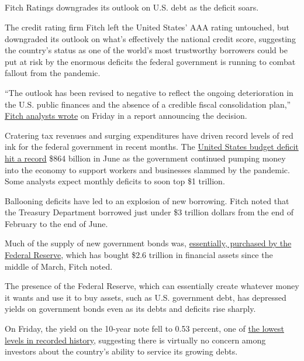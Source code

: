 \hypertarget{-7}{%
\subsection{}\label{-7}}

Fitch Ratings downgrades its outlook on U.S. debt as the deficit soars.

The credit rating firm Fitch left the United States' AAA rating
untouched, but downgraded its outlook on what's effectively the national
credit score, suggesting the country's status as one of the world's most
trustworthy borrowers could be put at risk by the enormous deficits the
federal government is running to combat fallout from the pandemic.

``The outlook has been revised to negative to reflect the ongoing
deterioration in the U.S. public finances and the absence of a credible
fiscal consolidation plan,''
\href{https://www.fitchratings.com/research/sovereigns/fitch-revises-united-states-outlook-to-negative-affirms-at-aaa-31-07-2020}{Fitch
analysts wrote} on Friday in a report announcing the decision.

Cratering tax revenues and surging expenditures have driven record
levels of red ink for the federal government in recent months. The
\href{https://www.nytimes3xbfgragh.onion/live/2020/07/13/business/stock-market-today-coronavirus\#the-us-budget-deficit-hits-another-monthly-record}{United
States budget deficit hit a record} \$864 billion in June as the
government continued pumping money into the economy to support workers
and businesses slammed by the pandemic. Some analysts expect monthly
deficits to soon top \$1 trillion.

Ballooning deficits have led to an explosion of new borrowing. Fitch
noted that the Treasury Department borrowed just under \$3 trillion
dollars from the end of February to the end of June.

Much of the supply of new government bonds was,
\href{https://www.nytimes3xbfgragh.onion/2020/04/15/business/coronavirus-stimulus-money.html}{essentially,
purchased by the Federal Reserve}, which has bought \$2.6 trillion in
financial assets since the middle of March, Fitch noted.

The presence of the Federal Reserve, which can essentially create
whatever money it wants and use it to buy assets, such as U.S.
government debt, has depressed yields on government bonds even as its
debts and deficits rise sharply.

On Friday, the yield on the 10-year note fell to 0.53 percent, one of
\href{https://www.marketwatch.com/story/10-year-treasury-yield-plunged-to-its-lowest-in-234-years-says-deutsche-bank-11596214464\#:~:text=The\%2010\%2Dyear\%20Treasury\%20note,scurrying\%20into\%20safe\%20haven\%20assets.}{the
lowest levels in recorded history}, suggesting there is virtually no
concern among investors about the country's ability to service its
growing debts.

